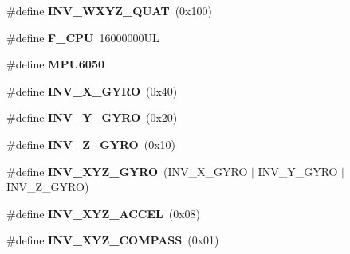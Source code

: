 \begin{DoxyCompactItemize}
\item 
\#define {\bfseries I\+N\+V\+\_\+\+W\+X\+Y\+Z\+\_\+\+Q\+U\+AT}~(0x100)\hypertarget{group___d_r_i_v_e_r_s_ga3d79cffe845a796a27d03432a1f2ade0}{}\label{group___d_r_i_v_e_r_s_ga3d79cffe845a796a27d03432a1f2ade0}

\item 
\#define {\bfseries F\+\_\+\+C\+PU}~16000000\+UL\hypertarget{group___d_r_i_v_e_r_s_ga43bafb28b29491ec7f871319b5a3b2f8}{}\label{group___d_r_i_v_e_r_s_ga43bafb28b29491ec7f871319b5a3b2f8}

\item 
\#define {\bfseries M\+P\+U6050}\hypertarget{group___d_r_i_v_e_r_s_ga6d132f914f18cb144a0eaf36312045c8}{}\label{group___d_r_i_v_e_r_s_ga6d132f914f18cb144a0eaf36312045c8}

\item 
\#define {\bfseries I\+N\+V\+\_\+\+X\+\_\+\+G\+Y\+RO}~(0x40)\hypertarget{group___d_r_i_v_e_r_s_gabf02bf28541421d59f8be764f2b95407}{}\label{group___d_r_i_v_e_r_s_gabf02bf28541421d59f8be764f2b95407}

\item 
\#define {\bfseries I\+N\+V\+\_\+\+Y\+\_\+\+G\+Y\+RO}~(0x20)\hypertarget{group___d_r_i_v_e_r_s_gacdd8ff833a34dba08ca2aa145eb92b44}{}\label{group___d_r_i_v_e_r_s_gacdd8ff833a34dba08ca2aa145eb92b44}

\item 
\#define {\bfseries I\+N\+V\+\_\+\+Z\+\_\+\+G\+Y\+RO}~(0x10)\hypertarget{group___d_r_i_v_e_r_s_ga50205b5cc6089b33b2561c854eb8b0fd}{}\label{group___d_r_i_v_e_r_s_ga50205b5cc6089b33b2561c854eb8b0fd}

\item 
\#define {\bfseries I\+N\+V\+\_\+\+X\+Y\+Z\+\_\+\+G\+Y\+RO}~(I\+N\+V\+\_\+\+X\+\_\+\+G\+Y\+RO $\vert$ I\+N\+V\+\_\+\+Y\+\_\+\+G\+Y\+RO $\vert$ I\+N\+V\+\_\+\+Z\+\_\+\+G\+Y\+RO)\hypertarget{group___d_r_i_v_e_r_s_ga3fdc30f9c0a26c2c4e2bb88921f91629}{}\label{group___d_r_i_v_e_r_s_ga3fdc30f9c0a26c2c4e2bb88921f91629}

\item 
\#define {\bfseries I\+N\+V\+\_\+\+X\+Y\+Z\+\_\+\+A\+C\+C\+EL}~(0x08)\hypertarget{group___d_r_i_v_e_r_s_gaa03f025a17ed491e70b88274e89c75c5}{}\label{group___d_r_i_v_e_r_s_gaa03f025a17ed491e70b88274e89c75c5}

\item 
\#define {\bfseries I\+N\+V\+\_\+\+X\+Y\+Z\+\_\+\+C\+O\+M\+P\+A\+SS}~(0x01)\hypertarget{group___d_r_i_v_e_r_s_ga7fc9c1dbdcb2ac8cc2a4128a5799482a}{}\label{group___d_r_i_v_e_r_s_ga7fc9c1dbdcb2ac8cc2a4128a5799482a}


\end{DoxyCompactItemize}
